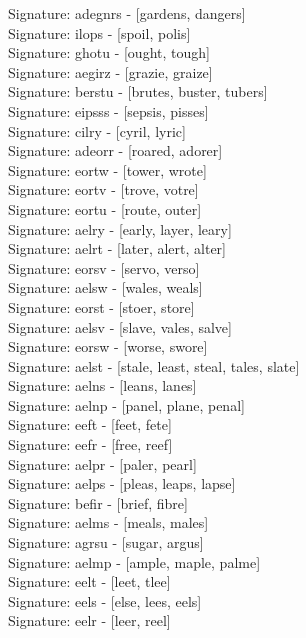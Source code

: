 Signature: {adegnrs} - [gardens, dangers] \\
Signature: {ilops} - [spoil, polis] \\
Signature: {ghotu} - [ought, tough] \\
Signature: {aegirz} - [grazie, graize] \\
Signature: {berstu} - [brutes, buster, tubers] \\
Signature: {eipsss} - [sepsis, pisses] \\
Signature: {cilry} - [cyril, lyric] \\
Signature: {adeorr} - [roared, adorer] \\
Signature: {eortw} - [tower, wrote] \\
Signature: {eortv} - [trove, votre] \\
Signature: {eortu} - [route, outer] \\
Signature: {aelry} - [early, layer, leary] \\
Signature: {aelrt} - [later, alert, alter] \\
Signature: {eorsv} - [servo, verso] \\
Signature: {aelsw} - [wales, weals] \\
Signature: {eorst} - [stoer, store] \\
Signature: {aelsv} - [slave, vales, salve] \\
Signature: {eorsw} - [worse, swore] \\
Signature: {aelst} - [stale, least, steal, tales, slate] \\
Signature: {aelns} - [leans, lanes] \\
Signature: {aelnp} - [panel, plane, penal] \\
Signature: {eeft} - [feet, fete] \\
Signature: {eefr} - [free, reef] \\
Signature: {aelpr} - [paler, pearl] \\
Signature: {aelps} - [pleas, leaps, lapse] \\
Signature: {befir} - [brief, fibre] \\
Signature: {aelms} - [meals, males] \\
Signature: {agrsu} - [sugar, argus] \\
Signature: {aelmp} - [ample, maple, palme] \\
Signature: {eelt} - [leet, tlee] \\
Signature: {eels} - [else, lees, eels] \\
Signature: {eelr} - [leer, reel] \\
